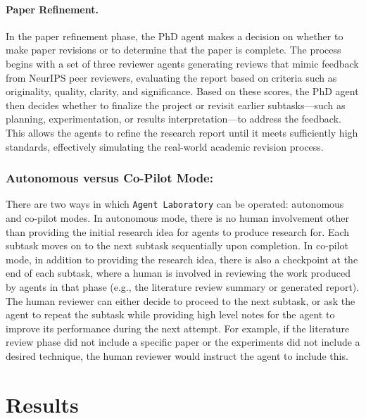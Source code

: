 \documentclass[11pt, a4paper]{gdm_format}
\begin{document}
\paragraph{Paper Refinement.}  In the paper refinement phase, the PhD agent makes a decision on whether to make paper revisions or to determine that the paper is complete. The process begins with a set of three reviewer agents generating reviews that mimic feedback from NeurIPS peer reviewers, evaluating the report based on criteria such as originality, quality, clarity, and significance. Based on these scores, the PhD agent then decides whether to finalize the project or revisit earlier subtasks—such as planning, experimentation, or results interpretation—to address the feedback. This allows the agents to refine the research report until it meets sufficiently high standards, effectively simulating the real-world academic revision process.

\subsubsection{Autonomous versus Co-Pilot Mode:} 
\label{sec:auto_vs_copilot}

There are two ways in which \texttt{Agent Laboratory} can be operated: autonomous and co-pilot modes. In autonomous mode, there is no human involvement other than providing the initial research idea for agents to produce research for. Each subtask moves on to the next subtask sequentially upon completion. In co-pilot mode, in addition to providing the research idea, there is also a checkpoint at the end of each subtask, where a human is involved in reviewing the work produced by agents in that phase (e.g., the literature review summary or generated report). The human reviewer can either decide to proceed to the next subtask, or ask the agent to repeat the subtask while providing high level notes for the agent to improve its performance during the next attempt. For example, if the literature review phase did not include a specific paper or the experiments did not include a desired technique, the human reviewer would instruct the agent to include this. 





\section{Results}
\label{sec:results}
\end{document}
